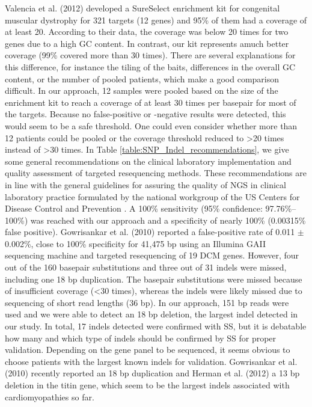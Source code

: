 Valencia et al. (2012)\cite{Valencia_2012} developed a SureSelect enrichment kit for congenital muscular dystrophy for 321 targets (12 genes) and 95\% of them had a coverage of at least 20. 
According to their data, the coverage was below 20 times for two genes due to a high GC content. 
In contrast, our kit represents amuch better coverage (99\% covered more than 30 times). 
There are several explanations for this difference, for instance the tiling of the baits, differences in the overall GC content, or the number of pooled patients, which make a good comparison difficult. 
In our approach, 12 samples were pooled based on the size of the enrichment kit to reach a coverage of at least 30 times per basepair for most of the targets. 
Because no false-positive or -negative results were detected, this would seem to be a safe threshold. One could even consider whether more than 12 patients could be pooled or the coverage threshold reduced to {\textgreater}20 times instead of {\textgreater}30 times. 
In Table \ref{table:SNP_Indel_recommendations}, we give some general recommendations on the clinical laboratory implementation and quality assessment of targeted resequencing methods. 
These recommendations are in line with the general guidelines for assuring the quality of NGS in clinical laboratory practice formulated by the national workgroup of the US Centers for Disease Control and Prevention \cite{Gargis_2012}.
A 100\% sensitivity (95\% confidence: 97.76\%–100\%) was reached with our approach and a specificity of nearly 100\% (0.00315\% false positive). 
Gowrisankar et al. (2010)\cite{Gowrisankar_2010} reported a false-positive rate of 0.011 $\pm$0.002\%, close to 100\% specificity for 41,475 bp using an Illumina GAII sequencing machine and targeted resequencing of 19 DCM genes. 
However, four out of the 160 basepair substitutions and three out of 31 indels were missed, including one 18 bp duplication. 
The basepair substitutions were missed because of insufficient coverage ({\textless}30 times), whereas the indels were likely missed due to sequencing of short read lengths (36 bp). 
In our approach, 151 bp reads were used and we were able to detect an 18 bp deletion, the largest indel detected in our study. 
In total, 17 indels detected were confirmed with SS, but it is debatable how many and which type of indels should be confirmed by SS for proper validation. 
Depending on the gene panel to be sequenced, it seems obvious to choose patients with the largest known indels for validation. 
Gowrisankar et al. (2010)\cite{Gowrisankar_2010} recently reported an 18 bp duplication and Herman et al. (2012)\cite{Herman_2012} a 13 bp deletion in the titin gene, which seem to be the largest indels associated with cardiomyopathies so far. 

